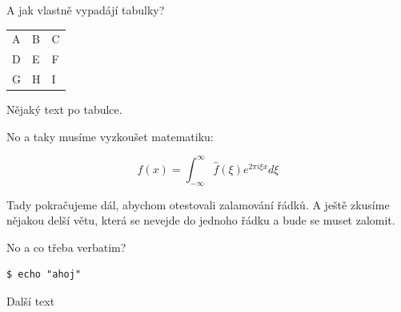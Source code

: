 \documentclass{article}
\begin{document}
A jak vlastně vypadájí tabulky?

\begin{table}[h]
\begin{tabular}{l|l|l}
  A & B & C \\
  D & E & F \\
  G & H & I \\
\end{tabular}
\end{table}

Nějaký text po tabulce.

No a taky musíme vyzkoušet matematiku:

\[
  f(x) = \int_{-\infty}^\infty \hat{f}(\xi) e^{2\pi i \xi x} d\xi
\]

Tady pokračujeme dál, abychom otestovali zalamování řádků. A ještě zkusíme nějakou delší větu, která se nevejde do jednoho řádku a bude se muset zalomit.

No a co třeba verbatim?
\begin{verbatim}
$ echo "ahoj"
\end{verbatim}
Další text

% 
\end{document}

